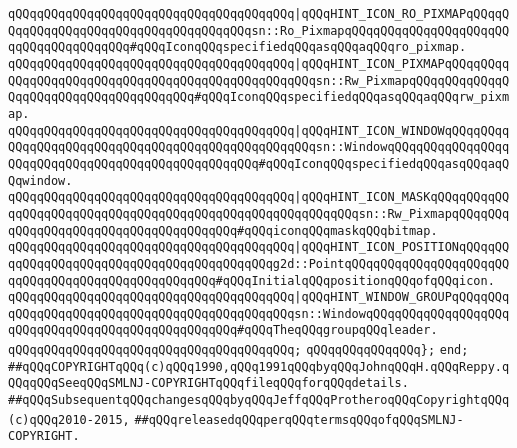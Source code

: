 \verb|qQQqqQQqqQQqqQQqqQQqqQQqqQQqqQQqqQQqqQQq|\verb#|qQQqHINT_ICON_RO_PIXMAPqQQqqQQqqQQqqQQqqQQqqQQqqQQqqQQqqQQqqQQqsn::Ro_PixmapqQQqqQQqqQQqqQQqqQQqqQQqqQQqqQQqqQQqqQQq#\verb|#qQQqIconqQQqspecifiedqQQqasqQQqaqQQqro_pixmap.|\newline
\verb|qQQqqQQqqQQqqQQqqQQqqQQqqQQqqQQqqQQqqQQq|\verb#|qQQqHINT_ICON_PIXMAPqQQqqQQqqQQqqQQqqQQqqQQqqQQqqQQqqQQqqQQqqQQqqQQqqQQqsn::Rw_PixmapqQQqqQQqqQQqqQQqqQQqqQQqqQQqqQQqqQQqqQQq#\verb|#qQQqIconqQQqspecifiedqQQqasqQQqaqQQqrw_pixmap.|\newline
\verb|qQQqqQQqqQQqqQQqqQQqqQQqqQQqqQQqqQQqqQQq|\verb#|qQQqHINT_ICON_WINDOWqQQqqQQqqQQqqQQqqQQqqQQqqQQqqQQqqQQqqQQqqQQqqQQqqQQqsn::WindowqQQqqQQqqQQqqQQqqQQqqQQqqQQqqQQqqQQqqQQqqQQqqQQqqQQq#\verb|#qQQqIconqQQqspecifiedqQQqasqQQqaqQQqwindow.|\newline
\verb|qQQqqQQqqQQqqQQqqQQqqQQqqQQqqQQqqQQqqQQq|\verb#|qQQqHINT_ICON_MASKqQQqqQQqqQQqqQQqqQQqqQQqqQQqqQQqqQQqqQQqqQQqqQQqqQQqqQQqqQQqsn::Rw_PixmapqQQqqQQqqQQqqQQqqQQqqQQqqQQqqQQqqQQqqQQq#\verb|#qQQqiconqQQqmaskqQQqbitmap.|\newline
\verb|qQQqqQQqqQQqqQQqqQQqqQQqqQQqqQQqqQQqqQQq|\verb#|qQQqHINT_ICON_POSITIONqQQqqQQqqQQqqQQqqQQqqQQqqQQqqQQqqQQqqQQqqQQqg2d::PointqQQqqQQqqQQqqQQqqQQqqQQqqQQqqQQqqQQqqQQqqQQqqQQqqQQq#\verb|#qQQqInitialqQQqpositionqQQqofqQQqicon.|\newline
\verb|qQQqqQQqqQQqqQQqqQQqqQQqqQQqqQQqqQQqqQQq|\verb#|qQQqHINT_WINDOW_GROUPqQQqqQQqqQQqqQQqqQQqqQQqqQQqqQQqqQQqqQQqqQQqqQQqsn::WindowqQQqqQQqqQQqqQQqqQQqqQQqqQQqqQQqqQQqqQQqqQQqqQQqqQQq#\verb|#qQQqTheqQQqgroupqQQqleader.|\newline
\verb|qQQqqQQqqQQqqQQqqQQqqQQqqQQqqQQqqQQqqQQq;|\newline
\newline
\verb|qQQqqQQqqQQqqQQq};|\newline
\newline
\verb|end;|\newline
\newline
\newline
\verb|##qQQqCOPYRIGHTqQQq(c)qQQq1990,qQQq1991qQQqbyqQQqJohnqQQqH.qQQqReppy.qQQqqQQqSeeqQQqSMLNJ-COPYRIGHTqQQqfileqQQqforqQQqdetails.|\newline
\verb|##qQQqSubsequentqQQqchangesqQQqbyqQQqJeffqQQqProtheroqQQqCopyrightqQQq(c)qQQq2010-2015,|\newline
\verb|##qQQqreleasedqQQqperqQQqtermsqQQqofqQQqSMLNJ-COPYRIGHT.|\newline

